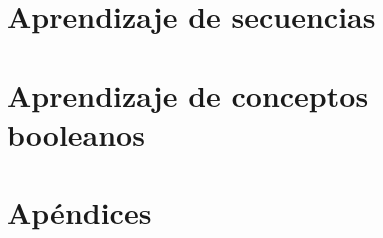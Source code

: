 \documentclass[a4paper,12pt,oneside]{book}
\begin{document}
    \part{Aprendizaje de secuencias}\label{parte:secuencias}
        
        
        
    \part{Aprendizaje de conceptos booleanos}\label{parte:conceptos}
        
        
        
         
    \part{Apéndices}
        \appendix
        
        
        
    
    
    
\end{document}

